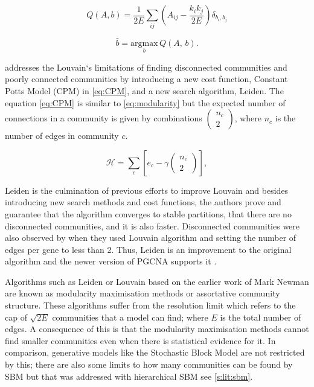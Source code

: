 \begin{equation} \label{eq:mod_max_cost}
    Q(A,b) = \frac{1}{2E} \sum_{ij} \left( A_{ij} - \frac{k_i k_j}{2E} \right) \delta_{b_i, b_j}
\end{equation}

\begin{equation} \label{eq:mod_max_per_com}
    \bar{b} = \underset{b}{\mathrm{argmax}} \, Q(A, \, b).
\end{equation}

\citet{Traag2019-ne} addresses the Louvain`s limitations of finding disconnected communities and poorly connected communities by introducing a new cost function, Constant Potts Model (CPM) in \cref{eq:CPM}, and a new search algorithm, Leiden. The equation \cref{eq:CPM} is similar to \cref{eq:modularity} but the expected number of connections in a community is given by combinations $(\begin{array}{c}{n}_{c}\\ 2\end{array})$, where $n_c$ is the number of edges in community $c$.

\begin{equation} \label{eq:CPM}
    {\mathcal H} ={\sum }_{c}[{e}_{c}-\gamma (\begin{array}{c}{n}_{c}\\ 2\end{array})],
\end{equation}

Leiden is the culmination of previous efforts to improve Louvain \citep{Ozaki2016-dl, Waltman2013-zw, Bae2017-rz, Traag2015-tq} and besides introducing new search methods and cost functions, the authors prove and guarantee that the algorithm converges to stable partitions, that there are no disconnected communities, and it is also faster. Disconnected communities were also observed by \citet{Care2019-ij} when they used Louvain algorithm and setting the number of edges per gene to less than 2. Thus, Leiden is an improvement to the original algorithm and the newer version of PGCNA supports it \citep{Care2019-ij} .

Algorithms such as Leiden or Louvain based on the earlier work of Mark Newman \citep{Newman2004-dd, Newman2006-dn} are known as modularity maximisation methods or assortative community structure. These algorithms suffer from the resolution limit \citep{Fortunato2007-gh, Peixoto2023-se} which refers to the cap of $\sqrt{2E}$ communities that a model can find; where $E$ is the total number of edges. A consequence of this is that the modularity maximisation methods cannot find smaller communities even when there is statistical evidence for it. In comparison, generative models like the Stochastic Block Model are not restricted by this; there are also some limits to how many communities can be found by SBM but that was addressed with hierarchical SBM see \cref{s:lit:sbm}.

